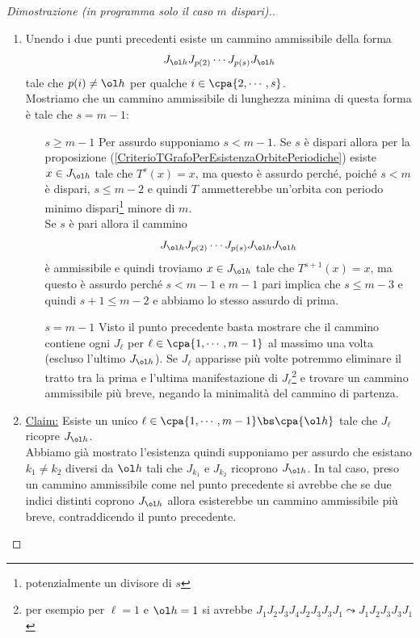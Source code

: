 \begin{proof}[Dimostrazione (in programma solo il caso $m$ dispari).]
\begin{enumerate}
Abbiamo quindi diviso i punti esattamente a met\`a, ma questo \`e assurdo perch\'e $m$ dispari.
\item Unendo i due punti precedenti esiste un cammino ammissibile della forma
\[J_{\ol h}J_{p(2)}\cdots J_{p(s)}J_{\ol h}\]
tale che $p(i)\neq \ol h$ per qualche $i\in\cpa{2,\cdots, s}$.\\
Mostriamo che un cammino ammissibile di lunghezza minima di questa forma \`e tale che $s=m-1$:
\setlength{\leftmargini}{0cm}
\begin{itemize}
\item[$\boxed{s\geq m-1}$] Per assurdo supponiamo $s<m-1$. Se $s$ \`e dispari allora per la proposizione (\ref{CriterioTGrafoPerEsistenzaOrbitePeriodiche}) esiste $x\in J_{\ol h}$ tale che $T^s(x)=x$, ma questo \`e assurdo perch\'e, poich\'e $s<m$ \`e dispari, $s\leq m-2$ e quindi $T$ ammetterebbe un'orbita con periodo minimo dispari\footnote{potenzialmente un divisore di $s$} minore di $m$.\\
Se $s$ \`e pari allora il cammino 
\[J_{\ol h}J_{p(2)}\cdots J_{p(s)}J_{\ol h}J_{\ol h}\]
\`e ammissibile e quindi troviamo $x\in J_{\ol h}$ tale che $T^{s+1}(x)=x$, ma questo \`e assurdo perch\'e $s<m-1$ e $m-1$ pari implica che $s\leq m-3$ e quindi $s+1\leq m-2$ e abbiamo lo stesso assurdo di prima.
\item[$\boxed{s=m-1}$] Visto il punto precedente basta mostrare che il cammino contiene ogni $J_{\ell}$ per $\ell\in\cpa{1,\cdots, m-1}$ al massimo una volta (escluso l'ultimo $J_{\ol h}$). Se $J_\ell$ apparisse pi\`u volte potremmo eliminare il tratto tra la prima e l'ultima manifestazione di $J_\ell$\footnote{per esempio per $\ell=1$ e $\ol h=1$ si avrebbe $J_1J_2J_3J_4J_2J_3J_3J_1\leadsto J_1J_2J_3J_3J_1$} e trovare un cammino ammissibile pi\`u breve, negando la minimalit\`a del cammino di partenza.
\end{itemize}
\setlength{\leftmargini}{0.5cm}

\item \underline{Claim:} Esiste un unico $\ell\in\cpa{1,\cdots,m-1}\bs\cpa{\ol h}$ tale che $J_\ell$ ricopre $J_{\ol h}$.\\
Abbiamo gi\`a mostrato l'esistenza quindi supponiamo per assurdo che esistano $k_1\neq k_2$ diversi da $\ol h$ tali che $J_{k_1}$ e $J_{k_2}$ ricoprono $J_{\ol h}$. In tal caso, preso un cammino ammissibile come nel punto precedente si avrebbe che se due indici distinti coprono $J_{\ol h}$ allora esisterebbe un cammino ammissibile pi\`u breve, contraddicendo il punto precedente.


\end{enumerate}
\end{proof}
